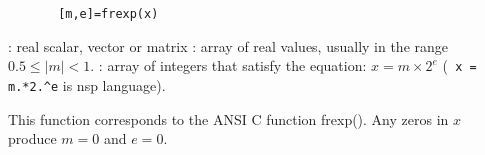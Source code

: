 

\begin{mandesc}
\end{mandesc}


\begin{calling_sequence}
    \begin{verbatim}
       [m,e]=frexp(x)  
    \end{verbatim}
\end{calling_sequence}


\begin{parameters}
  \begin{varlist}
    : real scalar, vector or matrix
    : array of real values, usually in the range $0.5 \le |m| < 1$.
    : array of integers that satisfy the equation: $x = m
   \times 2^e$ (\verb+ x = m.*2.^e+ is nsp language).
  \end{varlist}
\end{parameters}

\begin{mandescription}
    This function corresponds to the ANSI C function frexp().
  Any zeros in $x$ produce $m=0$ and $e=0$.
\end{mandescription}


\begin{examples}

\begin{program}
\end{program}

\end{examples}


\begin{manseealso}
\end{manseealso}

